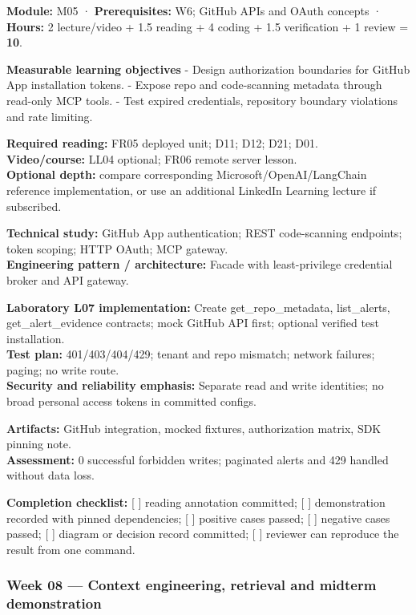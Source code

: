 \documentclass[
  10pt,
]{article}
\begin{document}
\textbf{Module:} M05 · \textbf{Prerequisites:} W6; GitHub APIs and OAuth
concepts · \textbf{Hours:} 2 lecture/video + 1.5 reading + 4 coding +
1.5 verification + 1 review = \textbf{10}.

\textbf{Measurable learning objectives} - Design authorization
boundaries for GitHub App installation tokens. - Expose repo and
code-scanning metadata through read-only MCP tools. - Test expired
credentials, repository boundary violations and rate limiting.

\textbf{Required reading:} FR05 deployed unit; D11; D12; D21; D01.\\
\textbf{Video/course:} LL04 optional; FR06 remote server lesson.\\
\textbf{Optional depth:} compare corresponding
Microsoft/OpenAI/LangChain reference implementation, or use an
additional LinkedIn Learning lecture if subscribed.

\textbf{Technical study:} GitHub App authentication; REST code-scanning
endpoints; token scoping; HTTP OAuth; MCP gateway.\\
\textbf{Engineering pattern / architecture:} Facade with least-privilege
credential broker and API gateway.

\textbf{Laboratory L07 implementation:} Create get\_repo\_metadata,
list\_alerts, get\_alert\_evidence contracts; mock GitHub API first;
optional verified test installation.\\
\textbf{Test plan:} 401/403/404/429; tenant and repo mismatch; network
failures; paging; no write route.\\
\textbf{Security and reliability emphasis:} Separate read and write
identities; no broad personal access tokens in committed configs.

\textbf{Artifacts:} GitHub integration, mocked fixtures, authorization
matrix, SDK pinning note.\\
\textbf{Assessment:} 0 successful forbidden writes; paginated alerts and
429 handled without data loss.

\textbf{Completion checklist:} {[} {]} reading annotation committed; {[}
{]} demonstration recorded with pinned dependencies; {[} {]} positive
cases passed; {[} {]} negative cases passed; {[} {]} diagram or decision
record committed; {[} {]} reviewer can reproduce the result from one
command.

\subsubsection{Week 08 --- Context engineering, retrieval and midterm
demonstration}\label{week-08-context-engineering-retrieval-and-midterm-demonstration}
\end{document}
